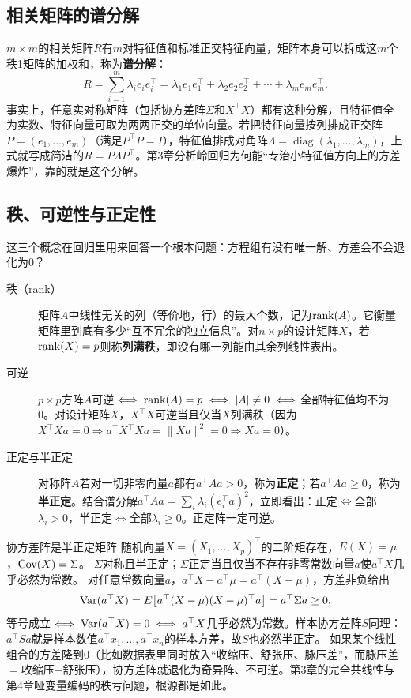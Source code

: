 \subsection{相关矩阵的谱分解}
$m\times m$的相关矩阵$R$有$m$对特征值和标准正交特征向量，矩阵本身可以拆成这$m$个秩1矩阵的加权和，称为\textbf{谱分解}：
\[
R=\sum_{i=1}^{m}\lambda_i e_i e_i^\top
=\lambda_1e_1e_1^\top+\lambda_2e_2e_2^\top+\cdots+\lambda_me_me_m^\top.
\]
事实上，任意实对称矩阵（包括协方差阵$\Sigma$和$X^\top X$）都有这种分解，且特征值全为实数、特征向量可取为两两正交的单位向量。若把特征向量按列排成正交阵$P=(e_1,\ldots,e_m)$（满足$P^\top P=I$），特征值排成对角阵$\Lambda=\operatorname{diag}(\lambda_1,\ldots,\lambda_m)$，上式就写成简洁的$R=P\Lambda P^\top$。第3章分析岭回归为何能“专治小特征值方向上的方差爆炸”，靠的就是这个分解。

\subsection{秩、可逆性与正定性}\label{sec:rank}
这三个概念在回归里用来回答一个根本问题：方程组有没有唯一解、方差会不会退化为0？
\begin{description}
\item[秩（rank）] 矩阵$A$中线性无关的列（等价地，行）的最大个数，记为$\operatorname{rank}(A)$。它衡量矩阵里到底有多少“互不冗余的独立信息”。对$n\times p$的设计矩阵$X$，若$\operatorname{rank}(X)=p$则称\textbf{列满秩}，即没有哪一列能由其余列线性表出。
\item[可逆] $p\times p$方阵$A$可逆$\iff\operatorname{rank}(A)=p\iff|A|\ne0\iff$全部特征值均不为0。对设计矩阵$X$，$X^\top X$可逆当且仅当$X$列满秩（因为$X^\top Xa=0\Rightarrow a^\top X^\top Xa=\|Xa\|^2=0\Rightarrow Xa=0$）。
\item[正定与半正定] 对称阵$A$若对一切非零向量$a$都有$a^\top Aa>0$，称为\textbf{正定}；若$a^\top Aa\ge0$，称为\textbf{半正定}。结合谱分解$a^\top Aa=\sum_i\lambda_i(e_i^\top a)^2$，立即看出：正定$\iff$全部$\lambda_i>0$，半正定$\iff$全部$\lambda_i\ge0$。正定阵一定可逆。
\end{description}
\begin{derivation}{协方差阵是半正定矩阵}
随机向量$X=(X_1,\ldots,X_p)^\top$的二阶矩存在，$E(X)=\mu$，$\operatorname{Cov}(X)=\Sigma$。
$\Sigma$对称且半正定；$\Sigma$正定当且仅当不存在非零常数向量$a$使$a^\top X$几乎必然为常数。
对任意常数向量$a$，$a^\top X-a^\top\mu=a^\top(X-\mu)$，方差非负给出
\[
\operatorname{Var}(a^\top X)=E\bigl[a^\top(X-\mu)(X-\mu)^\top a\bigr]=a^\top\Sigma a\ge0 .
\]
等号成立$\iff\operatorname{Var}(a^\top X)=0\iff a^\top X$几乎必然为常数。样本协方差阵$S$同理：$a^\top Sa$就是样本数值$a^\top x_1,\ldots,a^\top x_n$的样本方差，故$S$也必然半正定。
如果某个线性组合的方差降到0（比如数据表里同时放入“收缩压、舒张压、脉压差”，而脉压差$=$收缩压$-$舒张压），协方差阵就退化为奇异阵、不可逆。第3章的完全共线性与第4章哑变量编码的秩亏问题，根源都是如此。
\end{derivation}

